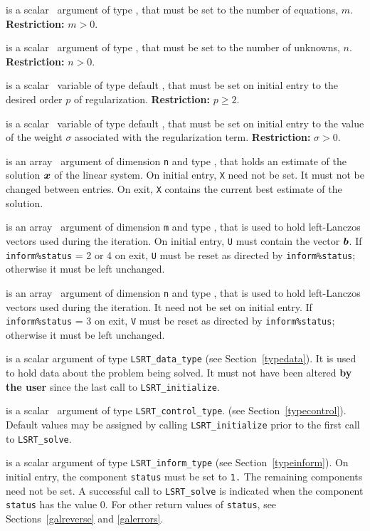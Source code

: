 \documentclass{galahad}
\newcommand{\packagename}{LS\-RT}
\begin{document}
\begin{description}

 is a scalar \intentin\ argument of type \integer, that must be
set to the number of equations, $m$. {\bf Restriction: } $m > 0$.

 is a scalar \intentin\ argument of type \integer, that must be
set to the number of unknowns, $n$. {\bf Restriction: } $n > 0$.

 is a scalar \intentin\ variable of type default
\realdp,
that must be set on initial entry to the desired order $p$ of regularization.
{\bf Restriction: } $p \geq 2$.

 is a scalar \intentin\ variable of type default
\realdp,
that must be set on initial entry
to the value of the weight $\sigma$ associated with the regularization term.
{\bf Restriction: } $\sigma > 0$.

 is an array \intentinout\ argument of dimension {\tt n} and
type \realdp,
that holds an estimate of the solution ${\bm{x}}$ of the linear system.
On initial entry, {\tt X} need not be set.
It must not be changed between entries.
On exit, {\tt X} contains the current best estimate of the solution.

 is an array \intentinout\ argument of dimension {\tt m} and
type \realdp,
that is used to hold left-Lanczos vectors used during the iteration.
On initial entry, {\tt U} must contain the vector ${\bm{b}}$.
If {\tt inform\%status} = 2 or 4 on exit, {\tt U} must be reset
as directed by  {\tt inform\%status}; otherwise
it must be left unchanged.

 is an array \intentinout\ argument of dimension {\tt n} and
type \realdp,
that is used to hold left-Lanczos vectors used during the iteration.
It need not be set on initial entry.
If {\tt inform\%status} = 3 on exit, {\tt V} must be reset
as directed by  {\tt inform\%status}; otherwise it must be left unchanged.

 is a scalar \intentinout argument of type
{\tt \packagename\_data\_type}
(see Section~\ref{typedata}). It is used to hold data about the problem being
solved. It must not have been altered {\bf by the user} since the last call to
{\tt \packagename\_initialize}.

 is a scalar \intentin\ argument of type
{\tt \packagename\_control\_type}.
(see Section~\ref{typecontrol}).
Default values may be assigned by calling {\tt \packagename\_initialize}
prior to the first call to {\tt \packagename\_solve}.

 is a scalar \intentinout argument of type
{\tt \packagename\_inform\_type}
(see Section~\ref{typeinform}).
On initial entry, the component {\tt status} must be set to {\tt 1.}
The remaining components need not be set.
A successful call to
{\tt \packagename\_solve}
is indicated when the  component {\tt status} has the value 0.
For other return values of {\tt status}, see Sections~\ref{galreverse}
and \ref{galerrors}.
\end{description}
\end{document}
